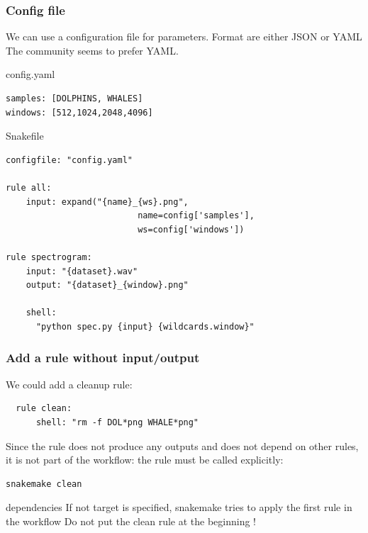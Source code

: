 \documentclass{beamer}
\begin{document}

\begin{frame}[fragile]
    \frametitle{Config file}
     We can use a configuration file for parameters. Format are either JSON or YAML
    The community seems to prefer YAML.
    
    \begin{block}{config.yaml}
        \begin{lstlisting}
samples: [DOLPHINS, WHALES]
windows: [512,1024,2048,4096]
        \end{lstlisting}
    \end{block}
    \begin{block}{Snakefile}
    \begin{lstlisting}
configfile: "config.yaml"

rule all:
    input: expand("{name}_{ws}.png", 
                          name=config['samples'], 
                          ws=config['windows'])

rule spectrogram:
    input: "{dataset}.wav"
    output: "{dataset}_{window}.png"
    
    shell: 
      "python spec.py {input} {wildcards.window}"
    \end{lstlisting}
    \end{block}
\end{frame}


\begin{frame}[fragile]
 \frametitle{Add a rule without input/output}
 
 We could add a cleanup rule:
 
 \begin{block}{}
 \begin{lstlisting}
  rule clean:
      shell: "rm -f DOL*png WHALE*png"
    \end{lstlisting}
 \end{block}

 Since the rule does not produce any outputs and does not depend on other rules, 
 it is not part of the workflow: the rule must be called explicitly:
 
 
 \begin{block}{}
 \begin{lstlisting}[language=bash]
 snakemake clean
 \end{lstlisting}
 \end{block}
 
 \begin{alertblock}{dependencies}
  If not target is specified, snakemake tries to apply the first rule in the workflow
  Do not put the clean rule at the beginning !
 \end{alertblock} 
\end{frame}
\end{document}
